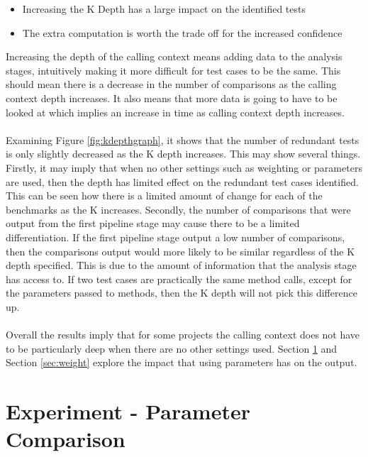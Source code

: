 \begin{itemize}
\item Increasing the K Depth has a large impact on the identified tests
\item The extra computation is worth the trade off for the increased confidence
\end{itemize}

Increasing the depth of the calling context means adding data to the analysis stages, intuitively making it more difficult for test cases to be the same. This should mean there is a decrease in the number of comparisons as the calling context depth increases. It also means that more data is going to have to be looked at which implies an increase in time as calling context depth increases.
\paragraph{}
Examining Figure \ref{fig:kdepthgraph}, it shows that the number of redundant tests is only slightly decreased as the K depth increases. This may show several things. Firstly, it may imply that when no other settings such as weighting or parameters are used, then the depth has limited effect on the redundant test cases identified. This can be seen how there is a limited amount of change for each of the benchmarks as the K increases. Secondly, the number of comparisons that were output from the first pipeline stage may cause there to be a limited differentiation. If the first pipeline stage output a low number of comparisons, then the comparisons output would more likely to be similar regardless of the K depth specified. This is due to the amount of information that the analysis stage has access to. If two test cases are practically the same method calls, except for the parameters passed to methods, then the K depth will not pick this difference up.
\paragraph{}
Overall the results imply that for some projects the calling context does not have to be particularly deep when there are no other settings used. Section \ref{sec:param} and Section \ref{sec:weight} explore the impact that using parameters has on the output.


\section{Experiment  - Parameter Comparison}
\label{sec:param}

